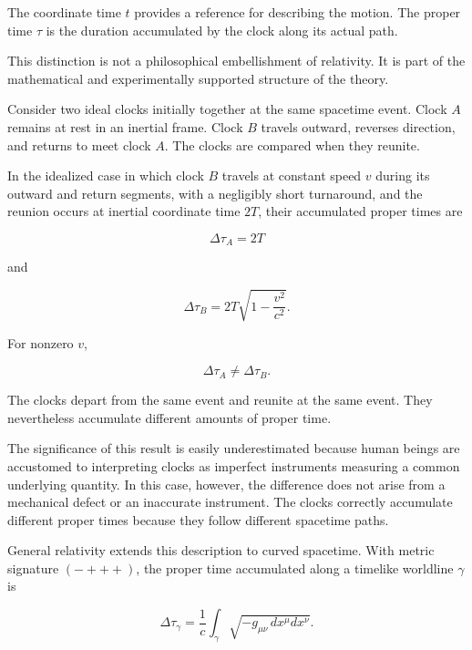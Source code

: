 \documentclass[12pt,onecolumn]{article}
\begin{document}
The coordinate time \(t\) provides a reference for describing the motion. The proper time \(\tau\) is the duration accumulated by the clock along its actual path.

This distinction is not a philosophical embellishment of relativity. It is part of the mathematical and experimentally supported structure of the theory.

Consider two ideal clocks initially together at the same spacetime event. Clock \(A\) remains at rest in an inertial frame. Clock \(B\) travels outward, reverses direction, and returns to meet clock \(A\). The clocks are compared when they reunite.

In the idealized case in which clock \(B\) travels at constant speed \(v\) during its outward and return segments, with a negligibly short turnaround, and the reunion occurs at inertial coordinate time \(2T\), their accumulated proper times are

\begin{equation}
\Delta\tau_A=2T
\end{equation}

and

\begin{equation}
\Delta\tau_B
=
2T\sqrt{1-\frac{v^2}{c^2}}.
\end{equation}

For nonzero \(v\),

\begin{equation}
\Delta\tau_A\neq\Delta\tau_B.
\end{equation}

The clocks depart from the same event and reunite at the same event. They nevertheless accumulate different amounts of proper time.

The significance of this result is easily underestimated because human beings are accustomed to interpreting clocks as imperfect instruments measuring a common underlying quantity. In this case, however, the difference does not arise from a mechanical defect or an inaccurate instrument. The clocks correctly accumulate different proper times because they follow different spacetime paths.

General relativity extends this description to curved spacetime. With metric signature \((-+++)\), the proper time accumulated along a timelike worldline \(\gamma\) is

\begin{equation}
\Delta\tau_\gamma
=
\frac{1}{c}
\int_\gamma
\sqrt{
-g_{\mu\nu}\,dx^\mu dx^\nu
}.
\end{equation}
\end{document}
